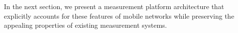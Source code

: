 In the next section, we present a measurement platform architecture that explicitly 
accounts for these features of mobile networks while preserving the 
appealing properties of existing measurement systems.


%
%
%
%
%
